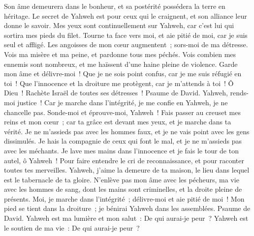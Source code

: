 \begin{multicols}{2}
 Son âme demeurera dans le bonheur, et sa postérité possédera la terre en héritage.
 Le secret de Yahweh est pour ceux qui le craignent, et son alliance leur donne le savoir.
 Mes yeux sont continuellement sur Yahweh, car c'est lui qui sortira mes pieds du filet.
 Tourne ta face vers moi, et aie pitié de moi, car je suis seul et affligé.
 Les angoisses de mon cœur augmentent~; sors-moi de ma détresse.
 Vois ma misère et ma peine, et pardonne tous mes péchés.
 Vois combien mes ennemis sont nombreux, et me haïssent d'une haine pleine de violence.
 Garde mon âme et délivre-moi~! Que je ne sois point confus, car je me suis réfugié en toi~!
 Que l'innocence et la droiture me protègent, car je m'attends à toi~!
 Ô Dieu~! Rachète Israël de toutes ses détresses~!
\VerseOne{}Psaume de David. Yahweh, rends-moi justice~! Car je marche dans l'intégrité, je me confie en Yahweh, je ne chancelle pas.
Sonde-moi et éprouve-moi, Yahweh~! Fais passer au creuset mes reins et mon cœur~;
car ta grâce est devant mes yeux, et je marche dans ta vérité.
Je ne m'assieds pas avec les hommes faux, et je ne vais point avec les gens dissimulés.
Je hais la compagnie de ceux qui font le mal, et je ne m'assieds pas avec les méchants.
Je lave mes mains dans l'innocence et je fais le tour de ton autel, ô Yahweh~!
Pour faire entendre le cri de reconnaissance, et pour raconter toutes tes merveilles.
Yahweh, j'aime la demeure de ta maison, le lieu dans lequel est le tabernacle de ta gloire.
N'enlève pas mon âme avec les pécheurs, ma vie avec les hommes de sang,
dont les mains sont criminelles, et la droite pleine de présents.
Moi, je marche dans l'intégrité~; délivre-moi et aie pitié de moi~!
Mon pied se tient dans la droiture~; je bénirai Yahweh dans les assemblées.
\VerseOne{}Psaume de David. Yahweh est ma lumière et mon salut~: De qui aurai-je peur~? Yahweh est le soutien de ma vie~: De qui aurai-je peur~?

\end{multicols}
